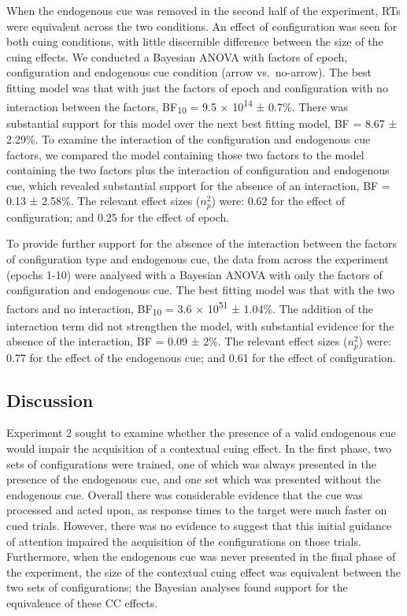 \documentclass[
  man,floatsintext]{apa7}
\begin{document}
When the endogenous cue was removed in the second half of the experiment, RTs were equivalent across the two conditions. An effect of configuration was seen for both cuing conditions, with little discernible difference between the size of the cuing effects. We conducted a Bayesian ANOVA with factors of epoch, configuration and endogenous cue condition (arrow vs.~no-arrow). The best fitting model was that with just the factors of epoch and configuration with no interaction between the factors, BF\textsubscript{10} = 9.5 × 10\textsuperscript{14} ± 0.7\%. There was substantial support for this model over the next best fitting model, BF = 8.67 ± 2.29\%. To examine the interaction of the configuration and endogenous cue factors, we compared the model containing those two factors to the model containing the two factors plus the interaction of configuration and endogenous cue, which revealed substantial support for the absence of an interaction, BF = 0.13 ± 2.58\%. The relevant effect sizes (\(n^2_p\)) were: 0.62 for the effect of configuration; and 0.25 for the effect of epoch.

To provide further support for the absence of the interaction between the factors of configuration type and endogenous cue, the data from across the experiment (epochs 1-10) were analysed with a Bayesian ANOVA with only the factors of configuration and endogenous cue. The best fitting model was that with the two factors and no interaction, BF\textsubscript{10} = 3.6 × 10\textsuperscript{51} ± 1.04\%. The addition of the interaction term did not strengthen the model, with substantial evidence for the absence of the interaction, BF = 0.09 ± 2\%. The relevant effect sizes (\(n^2_p\)) were: 0.77 for the effect of the endogenous cue; and 0.61 for the effect of configuration.

\hypertarget{discussion-1}{%
\subsection{Discussion}\label{discussion-1}}

Experiment 2 sought to examine whether the presence of a valid endogenous cue would impair the acquisition of a contextual cuing effect. In the first phase, two sets of configurations were trained, one of which was always presented in the presence of the endogenous cue, and one set which was presented without the endogenous cue. Overall there was considerable evidence that the cue was processed and acted upon, as response times to the target were much faster on cued trials. However, there was no evidence to suggest that this initial guidance of attention impaired the acquisition of the configurations on those trials. Furthermore, when the endogenous cue was never presented in the final phase of the experiment, the size of the contextual cuing effect was equivalent between the two sets of configurations; the Bayesian analyses found support for the equivalence of these CC effects.
\end{document}
